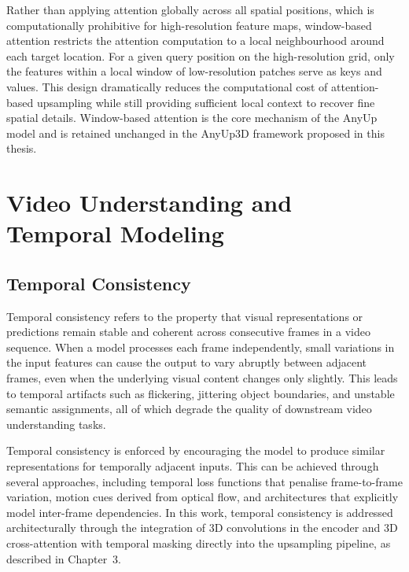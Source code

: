 Rather than applying attention globally across all spatial
positions, which is computationally prohibitive for
high-resolution feature maps, window-based attention restricts
the attention computation to a local neighbourhood around each
target location.
For a given query position on the high-resolution grid, only
the features within a local window of low-resolution patches
serve as keys and values.
This design dramatically reduces the computational cost of
attention-based upsampling while still providing sufficient
local context to recover fine spatial details.
Window-based attention is the core mechanism of the AnyUp model
and is retained unchanged in the AnyUp3D framework proposed
in this thesis.

\section{Video Understanding and Temporal Modeling}

\subsection{Temporal Consistency}

Temporal consistency refers to the property that visual
representations or predictions remain stable and coherent across
consecutive frames in a video sequence.
When a model processes each frame independently, small
variations in the input features can cause the output to vary
abruptly between adjacent frames, even when the underlying
visual content changes only slightly.
This leads to temporal artifacts such as flickering, jittering
object boundaries, and unstable semantic assignments, all of
which degrade the quality of downstream video understanding
tasks.

Temporal consistency is enforced by encouraging the model to
produce similar representations for temporally adjacent inputs.
This can be achieved through several approaches, including
temporal loss functions that penalise frame-to-frame variation,
motion cues derived from optical flow, and architectures that
explicitly model inter-frame dependencies.
In this work, temporal consistency is addressed architecturally
through the integration of 3D convolutions in the encoder and
3D cross-attention with temporal masking directly into the
upsampling pipeline, as described in Chapter~3.

